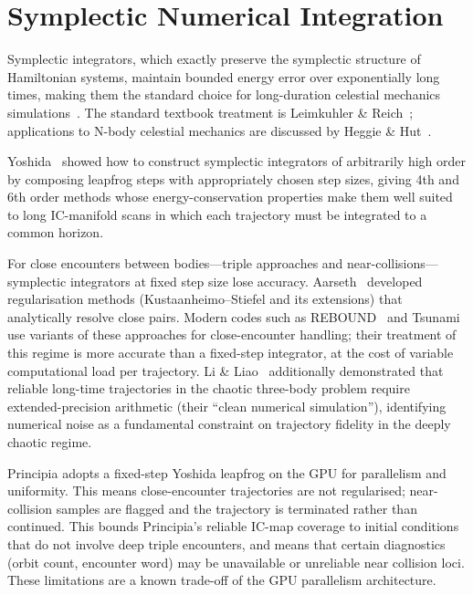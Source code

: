 \documentclass[11pt,a4paper]{article}
\begin{document}
\section{Symplectic Numerical Integration}

Symplectic integrators, which exactly preserve the symplectic structure of Hamiltonian systems,
maintain bounded energy error over exponentially long times, making them the standard choice for
long-duration celestial mechanics simulations~\cite{leimkuhler2004}.  The standard textbook
treatment is Leimkuhler \& Reich~\cite{leimkuhler2004}; applications to N-body celestial
mechanics are discussed by Heggie \& Hut~\cite{heggie2003}.

Yoshida~\cite{yoshida1990} showed how to construct symplectic integrators of arbitrarily high
order by composing leapfrog steps with appropriately chosen step sizes, giving 4th and 6th
order methods whose energy-conservation properties make them well suited to long IC-manifold
scans in which each trajectory must be integrated to a common horizon.

For close encounters between bodies---triple approaches and near-collisions---symplectic
integrators at fixed step size lose accuracy.  Aarseth~\cite{aarseth2003} developed
regularisation methods (Kustaanheimo--Stiefel and its extensions) that analytically resolve
close pairs.  Modern codes such as REBOUND~\cite{rein2012} and Tsunami~\cite{trani2024} use
variants of these approaches for close-encounter handling; their treatment of this regime is
more accurate than a fixed-step integrator, at the cost of variable computational load per
trajectory.  Li \& Liao~\cite{li2017} additionally demonstrated that reliable long-time
trajectories in the chaotic three-body problem require extended-precision arithmetic (their
``clean numerical simulation''), identifying numerical noise as a fundamental constraint on
trajectory fidelity in the deeply chaotic regime.

Principia adopts a fixed-step Yoshida leapfrog on the GPU for parallelism and uniformity.
This means close-encounter trajectories are not regularised; near-collision samples are
flagged and the trajectory is terminated rather than continued.  This bounds Principia's
reliable IC-map coverage to initial conditions that do not involve deep triple encounters,
and means that certain diagnostics (orbit count, encounter word) may be unavailable or
unreliable near collision loci.  These limitations are a known trade-off of the GPU
parallelism architecture.
\end{document}
